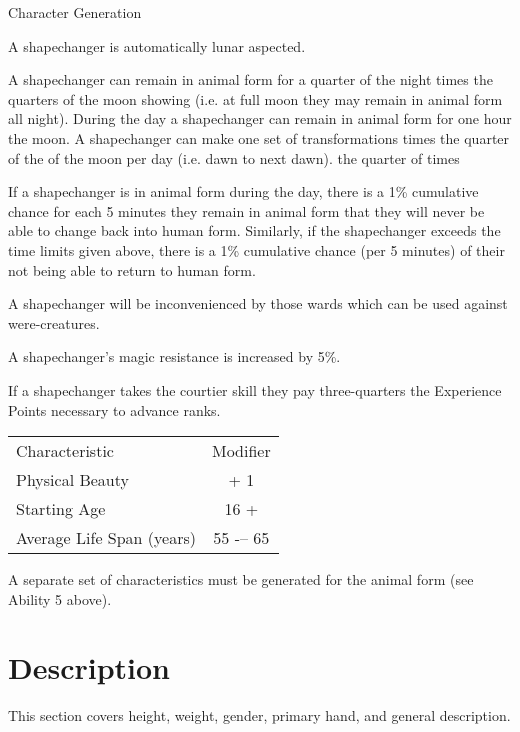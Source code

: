 \begin{Chapter}{Character Generation}
\begin{Enumerate}
\item A shapechanger is automatically lunar aspected.

\item A shapechanger can remain in animal form for a quarter of the
  night times the quarters of the moon showing (i.e.  at full moon
  they may remain in animal form all night).  During the day a
  shapechanger can remain in animal form for one hour the moon.  A
  shapechanger can make one set of transformations times the quarter
  of the of the moon per day (i.e.  dawn to next dawn).  the quarter
  of times

\item If a shapechanger is in animal form during the day, there is a
  1\% cumulative chance for each 5 minutes they remain in animal form
  that they will never be able to change back into human form.
  Similarly, if the shapechanger exceeds the time limits given above,
  there is a 1\% cumulative chance (per 5 minutes) of their not being
  able to return to human form.

\item A shapechanger will be inconvenienced by those wards which can
  be used against were-creatures.

\item A shapechanger’s magic resistance is increased by 5\%.

\item If a shapechanger takes the courtier skill they pay
  three-quarters the Experience Points necessary to advance ranks.

\end{Enumerate}

\begin{tabularx}{\columnwidth}{Xc}
Characteristic			& Modifier \\
Physical Beauty			& + 1 \\
Starting Age			& 16 +  \\
Average Life Span (years)	& 55 -– 65 \\
\end{tabularx}

A separate set of characteristics must be generated for the animal
form (see Ability 5 above).

\section{Description}

This section covers height, weight, gender, primary hand, and general
description.


\end{Chapter}
